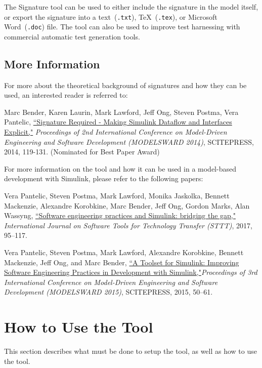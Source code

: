 \documentclass{article}
\makeatletter
\newcommand{\ToolName}{Signature\@\xspace}
\makeatother
\begin{document}
The \ToolName tool can be used to either include the signature in the model itself, or export the signature into a text~(\texttt{.txt}), \TeX~(\texttt{.tex}), or Microsoft Word~(\texttt{.doc}) file. The tool can also be used to improve test harnessing with commercial automatic test generation tools.

\subsection*{More Information}
For more about the theoretical background of signatures and how they can be used, an interested reader is referred to:

Marc Bender, Karen Laurin, Mark Lawford, Jeff Ong, Steven Postma, Vera Pantelic, \href{http://www.cas.mcmaster.ca/~lawford/papers/MODELSWARD2014.pdf}{``Signature Required - Making Simulink Dataflow and Interfaces Explicit,"} \textit{Proceedings of 2nd International Conference on Model-Driven Engineering and Software Development (MODELSWARD 2014)}, SCITEPRESS, 2014, 119-131. (Nominated for Best Paper Award)

\vspace{1em}
For more information on the tool and how it can be used in a model-based development with Simulink, please refer to the following papers:

\vspace{1em}
Vera Pantelic, Steven Postma, Mark Lawford, Monika Jaskolka, Bennett Mackenzie, Alexandre Korobkine, Marc Bender, Jeff Ong, Gordon Marks, Alan Wassyng, \href{https://link.springer.com/article/10.1007/s10009-017-0450-9}{``Software engineering practices and Simulink: bridging the gap,"} \textit{International Journal on Software Tools for Technology Transfer (STTT)}, 2017, 95--117.

\vspace{1em}
Vera Pantelic, Steven Postma, Mark Lawford, Alexandre Korobkine, Bennett Mackenzie, Jeff Ong, and Marc Bender, \href{http://www.cas.mcmaster.ca/~lawford/papers/MODELSWARD2015.pdf}{``A Toolset for Simulink: Improving Software Engineering Practices in Development with Simulink,"}\textit{Proceedings of 3rd International Conference on Model-Driven Engineering and Software Development (MODELSWARD 2015)}, SCITEPRESS, 2015, 50--61.

\newpage	
\section{How to Use the Tool}
This section describes what must be done to setup the tool, as well as how to use the tool.
\end{document}
